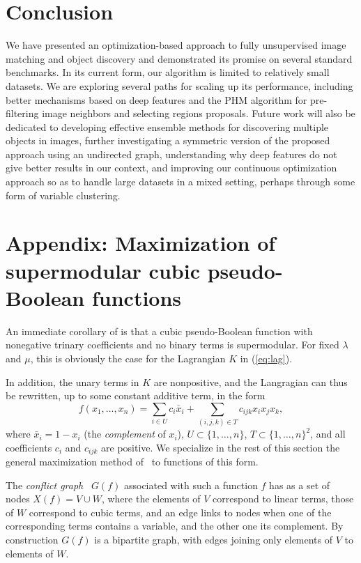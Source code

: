 \documentclass[10pt,twocolumn,letterpaper]{article}
\numberwithin{theorem}{section}
\begin{document}
\section{Conclusion}
We have presented an optimization-based approach to fully unsupervised image
matching and object discovery and demonstrated its promise on several standard benchmarks. In its current form, our algorithm is limited to relatively small datasets. We are exploring several paths for scaling up its performance, including better mechanisms based on deep features and the PHM algorithm for pre-filtering image neighbors and selecting regions proposals. Future work will also be dedicated to developing effective ensemble methods for discovering multiple objects in images, further investigating a symmetric version of the proposed approach using an undirected graph, understanding why deep features do not give better results in our context, and improving our continuous optimization approach so as to handle large datasets in a mixed setting, perhaps through some form of variable clustering.
\vspace{-2mm} \section*{Appendix: Maximization of supermodular cubic pseudo-Boolean functions} 
An immediate corollary of \cite[Lemma 1]{BiMi85} is
that a cubic pseudo-Boolean function with nonegative trinary coefficients
and no binary terms is supermodular.  For fixed 
$\lambda$
and $\mu$, this is obviously the case for the Lagrangian $K$ in (\ref{eq:lag}).

In addition, the unary terms in $K$ are nonpositive, and the Langragian
can thus be rewritten, up to some constant additive term, in the form
\begin{equation}
f(x_1,\ldots,x_n)=
\sum_{i\in U} c_i\bar{x}_i
+\displaystyle\sum_{(i,j,k)\in T} c_{ijk}x_ix_jx_k,
\label{eq:cubicps}
\end{equation}
where $\bar{x}_i=1-x_i$ (the {\em complement} of $x_i$),
$U\subset\{1,\ldots,n\}$, $T\subset\{1,\ldots,n\}^2$, and all
coefficients $c_i$ and $c_{ijk}$ are positive.  We specialize in the
rest of this section the general maximization method of~\cite{BiMi85}
to functions of this form.

The {\em conflict graph}~\cite{BiMi85,BoHa02} $G(f)$ associated with
such a function $f$ has as a set of nodes $X(f)=V\cup W$, where the
elements of $V$ correspond to linear terms, those of $W$ correspond to
cubic terms, and an edge links to nodes when one of the corresponding
terms contains a variable, and the other one its complement. By
construction $G(f)$ is a bipartite graph, with edges joining only
elements of $V$ to elements of $W$.
\end{document}
